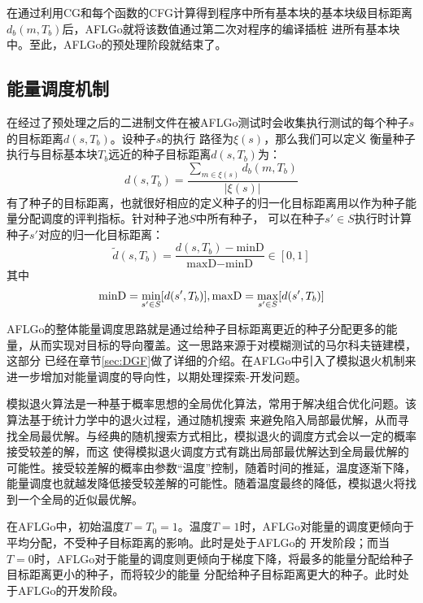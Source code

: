 \documentclass[bachelor]{njupthesis}
\begin{document}
在通过利用CG和每个函数的CFG计算得到程序中所有基本块的基本块级目标距离$d_b(m,T_b)$后，AFLGo就将该数值通过第二次对程序的编译插桩
进所有基本块中。至此，AFLGo的预处理阶段就结束了。

\subsection{能量调度机制}
在经过了预处理之后的二进制文件在被AFLGo测试时会收集执行测试的每个种子$s$的目标距离$d(s,T_b)$。设种子$s$的执行 路径为$\xi (s)$，那么我们可以定义
衡量种子执行与目标基本块$T_b$远近的种子目标距离$d(s,T_b)$为：
\begin{equation}\label{eq:sdis}
	d(s,T_b)=\frac{\sum\limits_{m \in \xi (s)}d_b(m,T_b)}{| \xi(s)| }
\end{equation}
有了种子的目标距离，也就很好相应的定义种子的归一化目标距离用以作为种子能量分配调度的评判指标。针对种子池$S$中所有种子，
可以在种子$s'\in S$执行时计算种子$s'$对应的归一化目标距离：
\begin{equation}\label{eq:sndis}
	\widetilde{d}(s,T_b)=\frac{d(s,T_b)-\text{minD}}{\text{maxD}-\text{minD}} \in [0,1]
\end{equation}
其中
\begin{equation}
	\text{minD}=\min\limits_{s'\in S}[d(s',T_b)] ,\\
	\text{maxD}=\max\limits_{s'\in S}[d(s',T_b)] 	
\end{equation}

AFLGo的整体能量调度思路就是通过给种子目标距离更近的种子分配更多的能量，从而实现对目标的导向覆盖。这一思路来源于对模糊测试的马尔科夫链建模，这部分
已经在章节\ref{sec:DGF}做了详细的介绍。在AFLGo中引入了模拟退火机制来进一步增加对能量调度的导向性，以期处理探索-开发问题。

模拟退火算法是一种基于概率思想的全局优化算法，常用于解决组合优化问题。该算法基于统计力学中的退火过程，通过随机搜索
来避免陷入局部最优解，从而寻找全局最优解。与经典的随机搜索方式相比，模拟退火的调度方式会以一定的概率接受较差的解，而这
使得模拟退火调度方式有跳出局部最优解达到全局最优解的可能性。接受较差解的概率由参数“温度”控制，随着时间的推延，温度逐渐下降，
能量调度也就越发降低接受较差解的可能性。随着温度最终的降低，模拟退火将找到一个全局的近似最优解。

在AFLGo中，初始温度$T=T_0=1$。温度$T=1$时，AFLGo对能量的调度更倾向于平均分配，不受种子目标距离的影响。此时是处于AFLGo的
开发阶段；而当$T=0$时，AFLGo对于能量的调度则更倾向于梯度下降，将最多的能量分配给种子目标距离更小的种子，而将较少的能量
分配给种子目标距离更大的种子。此时处于AFLGo的开发阶段。
\end{document}
